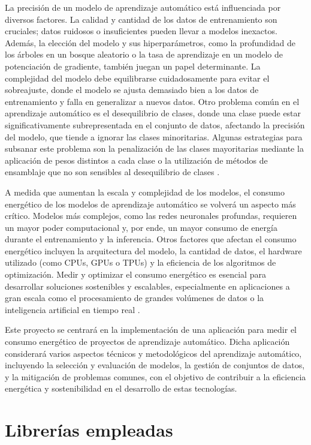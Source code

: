 La precisión de un modelo de aprendizaje automático está influenciada por diversos factores. La calidad y cantidad de los datos de entrenamiento son cruciales; datos ruidosos o insuficientes pueden llevar a modelos inexactos. Además, la elección del modelo y sus hiperparámetros, como la profundidad de los árboles en un bosque aleatorio o la tasa de aprendizaje en un modelo de potenciación de gradiente, también juegan un papel determinante. La complejidad del modelo debe equilibrarse cuidadosamente para evitar el sobreajuste, donde el modelo se ajusta demasiado bien a los datos de entrenamiento y falla en generalizar a nuevos datos.
Otro problema común en el aprendizaje automático es el desequilibrio de clases, donde una clase puede estar significativamente subrepresentada en el conjunto de datos, afectando la precisión del modelo, que tiende a ignorar las clases minoritarias. Algunas estrategias para subsanar este problema son la penalización de las clases mayoritarias mediante la aplicación de pesos distintos a cada clase o la utilización de métodos de ensamblaje que no son sensibles al desequilibrio de clases \cite{fernandez2018learning}.

A medida que aumentan la escala y complejidad de los modelos, el consumo energético de los modelos de aprendizaje automático se volverá un aspecto más crítico. Modelos más complejos, como las redes neuronales profundas, requieren un mayor poder computacional y, por ende, un mayor consumo de energía durante el entrenamiento y la inferencia. Otros factores que afectan el consumo energético incluyen la arquitectura del modelo, la cantidad de datos, el hardware utilizado (como CPUs, GPUs o TPUs) y la eficiencia de los algoritmos de optimización. Medir y optimizar el consumo energético es esencial para desarrollar soluciones sostenibles y escalables, especialmente en aplicaciones a gran escala como el procesamiento de grandes volúmenes de datos o la inteligencia artificial en tiempo real \cite{eva2019review}.

Este proyecto se centrará en la implementación de una aplicación para medir el consumo energético de proyectos de aprendizaje automático. Dicha aplicación considerará varios aspectos técnicos y metodológicos del aprendizaje automático, incluyendo la selección y evaluación de modelos, la gestión de conjuntos de datos, y la mitigación de problemas comunes, con el objetivo de contribuir a la eficiencia energética y sostenibilidad en el desarrollo de estas tecnologías.

\section{Librerías empleadas}

